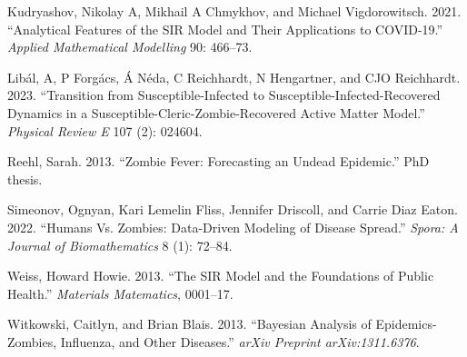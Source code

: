 \documentclass[
  12pt,
]{article}
\newlength{\cslhangindent}
\newlength{\cslentryspacingunit} %
\newenvironment{CSLReferences}[2] %
 {%
  \setlength{\parindent}{0pt}
  \ifodd #1
  \let\oldpar\par
  \def\par{\hangindent=\cslhangindent\oldpar}
  \fi
  \setlength{\parskip}{#2\cslentryspacingunit}
 }%
 {}
\begin{document}
\begin{CSLReferences}{1}{0}
\leavevmode{}%
Kudryashov, Nikolay A, Mikhail A Chmykhov, and Michael Vigdorowitsch.
2021. {``Analytical Features of the SIR Model and Their Applications to
COVID-19.''} \emph{Applied Mathematical Modelling} 90: 466--73.

\leavevmode{}%
Libál, A, P Forgács, Á Néda, C Reichhardt, N Hengartner, and CJO
Reichhardt. 2023. {``Transition from Susceptible-Infected to
Susceptible-Infected-Recovered Dynamics in a
Susceptible-Cleric-Zombie-Recovered Active Matter Model.''}
\emph{Physical Review E} 107 (2): 024604.

\leavevmode{}%
Reehl, Sarah. 2013. {``Zombie Fever: Forecasting an Undead Epidemic.''}
PhD thesis.

\leavevmode{}%
Simeonov, Ognyan, Kari Lemelin Fliss, Jennifer Driscoll, and Carrie Diaz
Eaton. 2022. {``Humans Vs. Zombies: Data-Driven Modeling of Disease
Spread.''} \emph{Spora: A Journal of Biomathematics} 8 (1): 72--84.

\leavevmode{}%
Weiss, Howard Howie. 2013. {``The SIR Model and the Foundations of
Public Health.''} \emph{Materials Matematics}, 0001--17.

\leavevmode{}%
Witkowski, Caitlyn, and Brian Blais. 2013. {``Bayesian Analysis of
Epidemics-Zombies, Influenza, and Other Diseases.''} \emph{arXiv
Preprint arXiv:1311.6376}.

\end{CSLReferences}
\end{document}
